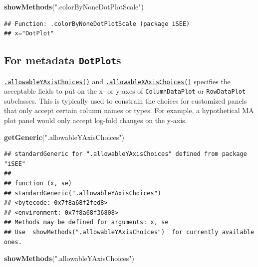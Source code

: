 \documentclass[
]{book}
\newenvironment{Shaded}{\begin{snugshade}}{\end{snugshade}}
\newcommand{\KeywordTok}[1]{\textcolor[rgb]{0.13,0.29,0.53}{\textbf{#1}}}
\newcommand{\NormalTok}[1]{#1}
\newcommand{\StringTok}[1]{\textcolor[rgb]{0.31,0.60,0.02}{#1}}
\begin{document}
\begin{Shaded}
\begin{Highlighting}[]
\KeywordTok{showMethods}\NormalTok{(}\StringTok{".colorByNoneDotPlotScale"}\NormalTok{)}
\end{Highlighting}
\end{Shaded}

\begin{verbatim}
## Function: .colorByNoneDotPlotScale (package iSEE)
## x="DotPlot"
\end{verbatim}

\hypertarget{for-metadata-dotplots}{%
\subsection{\texorpdfstring{For metadata \texttt{DotPlot}s}{For metadata DotPlots}}\label{for-metadata-dotplots}}

\href{https://isee.github.io/iSEE/reference/metadata-plot-generics.html}{\texttt{.allowableYAxisChoices()}} and \href{https://isee.github.io/iSEE/reference/metadata-plot-generics.html}{\texttt{.allowableXAxisChoices()}} specifies the acceptable fields to put on the x- or y-axes of \texttt{ColumnDataPlot} or \texttt{RowDataPlot} subclasses.
This is typically used to constrain the choices for customized panels that only accept certain column names or types.
For example, a hypothetical MA plot panel would only accept log-fold changes on the y-axis.

\begin{Shaded}
\begin{Highlighting}[]
\KeywordTok{getGeneric}\NormalTok{(}\StringTok{".allowableYAxisChoices"}\NormalTok{)}
\end{Highlighting}
\end{Shaded}

\begin{verbatim}
## standardGeneric for ".allowableYAxisChoices" defined from package "iSEE"
## 
## function (x, se) 
## standardGeneric(".allowableYAxisChoices")
## <bytecode: 0x7f8a68f2fed8>
## <environment: 0x7f8a68f36808>
## Methods may be defined for arguments: x, se
## Use  showMethods(".allowableYAxisChoices")  for currently available ones.
\end{verbatim}

\begin{Shaded}
\begin{Highlighting}[]
\KeywordTok{showMethods}\NormalTok{(}\StringTok{".allowableYAxisChoices"}\NormalTok{)}
\end{Highlighting}
\end{Shaded}
\end{document}
